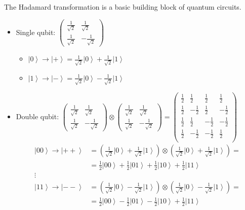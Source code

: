 \documentclass{scrartcl}
\newcommand{\ket}[1]{\left| #1 \right>} %
\newcommand{\half}{\frac12} %
\begin{document}
The Hadamard transformation is a basic building block of quantum circuits.
\begin{itemize}
\item Single qubit: $\left( \begin{array}{cc} \frac1{\sqrt{2}} & \frac1{\sqrt{2}} \\
      \frac1{\sqrt{2}} & - \frac1{\sqrt{2}}
    \end{array} \right)$
  \begin{itemize}
  \item $\ket0 \to \ket+ = \frac1{\sqrt2} \ket0 + \frac1{\sqrt2} \ket1$
  \item $\ket1 \to \ket- = \frac1{\sqrt2} \ket0 - \frac1{\sqrt2} \ket1$
  \end{itemize}
\item Double qubit: $\left( \begin{array}{cc} \frac1{\sqrt{2}} & \frac1{\sqrt{2}} \\
      \frac1{\sqrt{2}} & - \frac1{\sqrt{2}}
    \end{array} \right) \otimes \left( \begin{array}{cc} \frac1{\sqrt{2}} & \frac1{\sqrt{2}} \\
      \frac1{\sqrt{2}} & - \frac1{\sqrt{2}}
    \end{array} \right) = \left( \begin{array}{rrrr} 
      \half & \half & \half & \half \\
      \half & -\half & \half & -\half \\
      \half & \half & -\half & -\half \\
      \half & -\half & -\half & \half \\
    \end{array} \right) $
  \begin{equation*} \begin{split} \ket{00} \to \ket{++} &= \left(\frac1{\sqrt2}
        \ket0 + \frac1{\sqrt2} \ket1\right) \otimes
      \left(\frac1{\sqrt2} \ket0 + \frac1{\sqrt2} \ket1\right) = \\
      &= \frac12\ket{00} + \frac12\ket{01} + \frac12\ket{10} + \frac12\ket{11}\\
      \vdots \\
      \ket{11} \to \ket{--} &= \left(\frac1{\sqrt2} \ket0 - \frac1{\sqrt2}
        \ket1\right) \otimes
      \left(\frac1{\sqrt2} \ket0 - \frac1{\sqrt2} \ket1\right) = \\
      &= \frac12\ket{00} - \frac12\ket{01} - \frac12\ket{10} + \frac12\ket{11}\\

\end{split}
\end{equation*}
\end{itemize}
\end{document}
